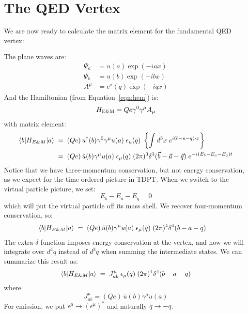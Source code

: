 \documentclass[12pt]{article}
\begin{document}
\section{The QED Vertex}

We are now ready to calculate the matrix element for the fundamental QED vertex:
\begin{center}
\end{center}
The plane waves are:
\begin{align*}
  \Psi_a &= u(a) \exp(-iax) \\
  \Psi_b &= u(b) \exp(-ibx) \\
  A^\mu  &= \epsilon^\mu(q) \exp(-iqx) 
\end{align*}
And the Hamiltonian (from Equation~\ref{eqn:hem}) is:
$$H_{\rm E\&M} = Q e \gamma^0 \gamma^\mu A_\mu$$
with matrix element:
\begin{align*}
  \braket{b | H_{E\&M} | a} \; &= \; (Qe) \, u^\dagger(b) \gamma^0 \gamma^\mu u(a) \; \epsilon_\mu(q) \;  
\left\{ \int d^3x \; e^{i (b-a-q) \cdot x} \right\}\\
&= \; (Qe) \, \bar{u}(b) \gamma^\mu u(a) \; \epsilon_\mu(q) \;  
(2\pi)^3 \delta^3(\vec{b}-\vec{a}-\vec{q}) \; e^{-i (E_b-E_a-E_q)t}
\end{align*}
Notice that we have three-momentum conservation, but not energy
conservation, as we expect for the time-ordered picture in TDPT.  When
we switch to the virtual particle picture, we set:
$$E_b-E_a-E_q = 0$$
which will put the virtual particle off its mass shell.  We recover four-momentum conservation, so:
\begin{align*}
  \braket{b | H_{E\&M} | a} \; 
&= \; (Qe) \, \bar{u}(b) \gamma^\mu u(a) \; \epsilon_\mu(q) \;  
(2\pi)^4 \delta^4(b-a-q)
\end{align*}
The extra $\delta$-function imposes energy conservation at the
vertex, and now we will integrate over $d^4q$ instead of
$d^3q$ when summing the intermediate states.  We can summarize this result as:
\begin{equation}
\braket{b | H_{E\&M} | a} \; 
= \; J^\mu_{ab} \; \epsilon_\mu(q) \;  
(2\pi)^4 \delta^4(b-a-q)
\end{equation}
where
\begin{equation}
J^\mu_{ab} = (Qe) \, \bar{u}(b) \gamma^\mu u(a) 
\end{equation}
For emission, we put $\epsilon^\mu \to (\epsilon^\mu)^*$ and naturally $q \to -q$.
\end{document}
